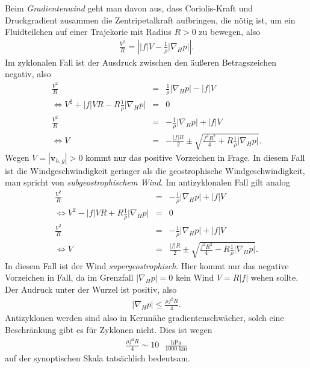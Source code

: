\documentclass{book}
\begin{document}
Beim \textit{Gradientenwind} geht man davon aus, dass Coriolis-Kraft und Druckgradient zusammen die Zentripetalkraft aufbringen, die nötig ist, um ein Fluidteilchen auf einer Trajekorie mit Radius $R > 0$ zu bewegen, also
%
\begin{eqnarray}
\frac{V^2}{R} = \left|\left|f\right|V - \frac{1}{\rho}\left|\nabla_Hp\right|\right|.
\end{eqnarray}
%
Im zyklonalen Fall ist der Ausdruck zwischen den äußeren Betragszeichen negativ, also
%
\begin{eqnarray}
\frac{V^2}{R} & = & \frac{1}{\rho}\left|\nabla_Hp\right| - \left|f\right|V\nonumber\\
\Leftrightarrow V^2 + \left|f\right|VR - R\frac{1}{\rho}\left|\nabla_Hp\right| & = & 0 \nonumber\\
\frac{V^2}{R} & = & -\frac{1}{\rho}\left|\nabla_Hp\right| + \left|f\right|V\nonumber\\
\Leftrightarrow V & = & -\frac{\left|f\right|R}{2} \pm \sqrt{\frac{f^2R^2}{4} + R\frac{1}{\rho}\left|\nabla_Hp\right|}.
\end{eqnarray}
%
Wegen $V = \left|\mathbf{v}_{h, g}\right| > 0$ kommt nur das positive Vorzeichen in Frage. In diesem Fall ist die Windgeschwindigkeit geringer als die geostrophische Windgeschwindigkeit, man spricht von \textit{subgeostrophischem Wind}. Im antizyklonalen Fall gilt analog
%
\begin{eqnarray}
\frac{V^2}{R} & = & -\frac{1}{\rho}\left|\nabla_Hp\right| + \left|f\right|V\nonumber\\
\Leftrightarrow V^2 - \left|f\right|VR + R\frac{1}{\rho}\left|\nabla_Hp\right| & = & 0 \nonumber\\
\frac{V^2}{R} & = & -\frac{1}{\rho}\left|\nabla_Hp\right| + \left|f\right|V\nonumber\\
\Leftrightarrow V & = & \frac{\left|f\right|R}{2} \pm \sqrt{\frac{f^2R^2}{4} - R\frac{1}{\rho}\left|\nabla_Hp\right|}.
\end{eqnarray}
%
In diesem Fall ist der Wind \textit{supergeostrophisch}. Hier kommt nur das negative Vorzeichen in Fall, da im Grenzfall $\left|\nabla_Hp\right| = 0$ kein Wind $V = R\left|f\right|$ wehen sollte. Der Audruck unter der Wurzel ist positiv, also
%
\begin{eqnarray}
\left|\nabla_Hp\right| \leq \frac{\rho f^2R}{4}.
\end{eqnarray}
%
Antizyklonen werden sind also in Kernnähe gradientenschwächer, solch eine Beschränkung gibt es für Zyklonen nicht. Dies ist wegen
%
\begin{eqnarray}
\frac{\rho f^2R}{4} \sim 10\text{ }\frac{\text{hPa}}{\text{1000 km}}
\end{eqnarray}
%
auf der synoptischen Skala tatsächlich bedeutsam.
\end{document}
